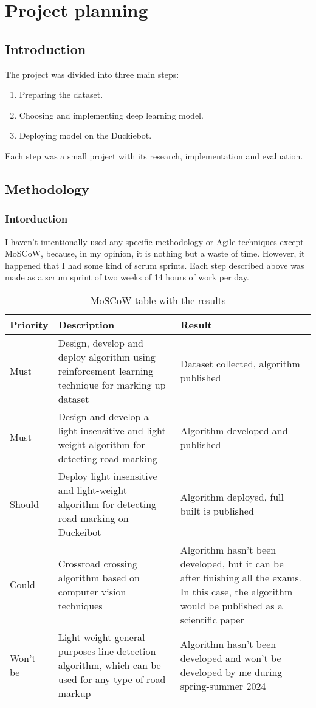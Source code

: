 \section{Project planning}
\subsection{Introduction}
The project was divided into three main steps:
\begin{enumerate}
    \item Preparing the dataset.
    \item Choosing and implementing deep learning model.
    \item Deploying model on the Duckiebot.
\end{enumerate}
Each step was a small project with its research, implementation and evaluation. 
\subsection{Methodology}
\subsubsection{Intorduction}
I haven't intentionally used any specific methodology or Agile techniques except MoSCoW, 
because, in my opinion, it is nothing but a waste of time. However, it happened that I had some kind of scrum sprints.
Each step described above was made as a scrum sprint of two weeks of 14 hours of work per day.
\begin{table}[h]
    \centering 
    \begin{tabular}{|p{1.7cm}|p{6cm}|p{6cm}|}
        \hline
        Priority & Description & Result \\ \hline
        Must & Design, develop and deploy algorithm using reinforcement learning technique for marking up dataset & Dataset collected, algorithm published \\ \hline
        Must & Design and develop a light-insensitive and light-weight algorithm for detecting road marking & Algorithm developed and published \\ \hline
        Should & Deploy light insensitive and light-weight algorithm for detecting road marking on Duckeibot & Algorithm deployed, full built is published  \\ \hline
        Could & Crossroad crossing algorithm based on computer vision techniques & Algorithm hasn't been developed, 
        but it can be after finishing all the exams. In this case, the algorithm would be published as a scientific paper \\  \hline
        Won't be & Light-weight general-purposes line detection algorithm, which can be used for any type of road markup & Algorithm hasn't been developed and won't be
        developed by me during spring-summer 2024\\ \hline
    \end{tabular}
    \caption{MoSCoW table with the results}\label{tab:MoSCoW}
\end{table}

